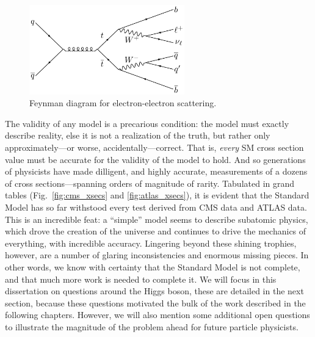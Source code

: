 \begin{figure}[htb]
    \centering
    \includegraphics[width=0.6\textwidth]{fig/feynman/ttbar/ttbar_onelep.pdf} %
    \caption{
        Feynman diagram for electron-electron scattering. 
    }
    \label{fig:ee_scattering}
\end{figure}

The validity of any model is a precarious condition: the model must exactly describe reality, else it is not a realization of the truth, but rather only approximately---or worse, accidentally---correct. 
That is, \textit{every} SM cross section value must be accurate for the validity of the model to hold. 
And so generations of physicists have made dilligent, and highly accurate, measurements of a dozens of cross sections---spanning orders of magnitude of rarity. 
Tabulated in grand tables (Fig.~\ref{fig:cms_xsecs} and \ref{fig:atlas_xsecs}), it is evident that the Standard Model has so far withstood every test derived from CMS data and ATLAS data. 
This is an incredible feat: a ``simple'' model seems to describe subatomic physics, which drove the creation of the universe and continues to drive the mechanics of everything, with incredible accuracy. 
Lingering beyond these shining trophies, however, are a number of glaring inconsistencies and enormous missing pieces. 
In other words, we know with certainty that the Standard Model is not complete, and that much more work is needed to complete it. 
We will focus in this dissertation on questions around the Higgs boson, these are detailed in the next section, because these questions motivated the bulk of the work described in the following chapters. 
However, we will also mention some additional open questions to illustrate the magnitude of the problem ahead for future particle physicists. 


